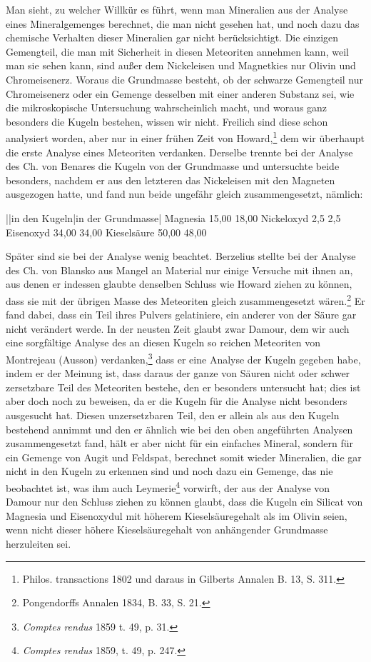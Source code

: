 \documentclass[a4paper, 11pt, oneside]{article}
\begin{document}
Man sieht, zu welcher Willkür es führt, wenn man Mineralien aus der Analyse eines Mineralgemenges berechnet, die man nicht gesehen hat, und noch dazu das chemische Verhalten dieser Mineralien gar nicht berücksichtigt. Die einzigen Gemengteil, die man mit Sicherheit in diesen Meteoriten annehmen kann, weil man sie sehen kann, sind außer dem Nickeleisen und Magnetkies nur Olivin und Chromeisenerz. Woraus die Grundmasse besteht, ob der schwarze Gemengteil nur Chromeisenerz oder ein Gemenge desselben mit einer anderen Substanz sei, wie die mikroskopische Untersuchung wahrscheinlich macht, und woraus ganz besonders die Kugeln bestehen, wissen wir nicht. Freilich sind diese schon analysiert worden, aber nur in einer frühen Zeit von Howard,\footnote{Philos. transactions 1802 und daraus in Gilberts Annalen B. 13, S. 311.} dem wir überhaupt die erste Analyse eines Meteoriten verdanken. Derselbe trennte bei der Analyse des Ch. von Benares die Kugeln von der Grundmasse und untersuchte beide besonders, nachdem er aus den letzteren das Nickeleisen mit den Magneten ausgezogen hatte, und fand nun beide ungefähr gleich zusammengesetzt, nämlich:

||in den Kugeln|in der Grundmasse|  
Magnesia 15,00 18,00  
Nickeloxyd 2,5 2,5  
Eisenoxyd 34,00 34,00  
Kieselsäure 50,00 48,00  

Später sind sie bei der Analyse wenig beachtet. Berzelius stellte bei der Analyse des Ch. von Blansko aus Mangel an Material nur einige Versuche mit ihnen an, aus denen er indessen glaubte denselben Schluss wie Howard ziehen zu können, dass sie mit der übrigen Masse des Meteoriten gleich zusammengesetzt wären.\footnote{Pongendorffs Annalen 1834, B. 33, S. 21.} Er fand dabei, dass ein Teil ihres Pulvers gelatiniere, ein anderer von der Säure gar nicht verändert werde. In der neusten Zeit glaubt zwar Damour, dem wir auch eine sorgfältige Analyse des an diesen Kugeln so reichen Meteoriten von Montrejeau (Ausson) verdanken,\footnote{\emph{Comptes rendus} 1859 t. 49, p. 31.} dass er eine Analyse der Kugeln gegeben habe, indem er der Meinung ist, dass daraus der ganze von Säuren nicht oder schwer zersetzbare Teil des Meteoriten bestehe, den er besonders untersucht hat; dies ist aber doch noch zu beweisen, da er die Kugeln für die Analyse nicht besonders ausgesucht hat. Diesen unzersetzbaren Teil, den er allein als aus den Kugeln bestehend annimmt und den er ähnlich wie bei den oben angeführten Analysen zusammengesetzt fand, hält er aber nicht für ein einfaches Mineral, sondern für ein Gemenge von Augit und Feldspat, berechnet somit wieder Mineralien, die gar nicht in den Kugeln zu erkennen sind und noch dazu ein Gemenge, das nie beobachtet ist, was ihm auch Leymerie\footnote{\emph{Comptes rendus} 1859, t. 49, p. 247.} vorwirft, der aus der Analyse von Damour nur den Schluss ziehen zu können glaubt, dass die Kugeln ein Silicat von Magnesia und Eisenoxydul mit höherem Kieselsäuregehalt als im Olivin seien, wenn nicht dieser höhere Kieselsäuregehalt von anhängender Grundmasse herzuleiten sei.
\end{document}
